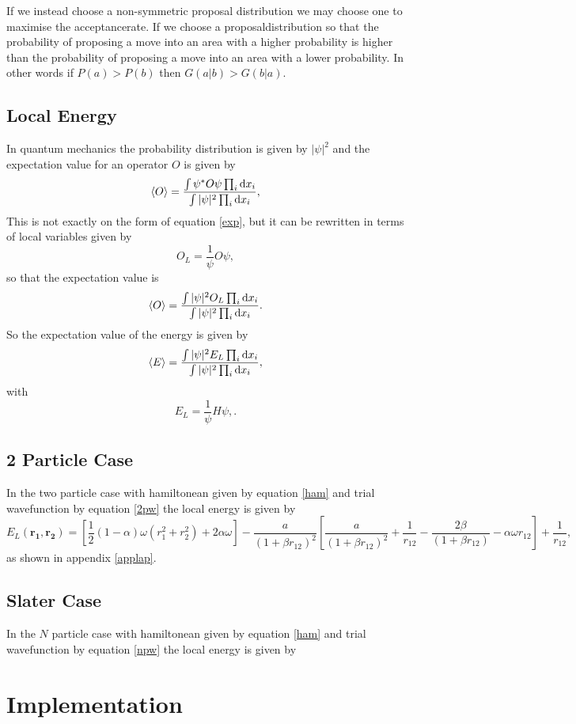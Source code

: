 \documentclass[a4paper,norsk,10pt]{article}
\newcommand{\bb}[1]{\boldsymbol{#1}}
\newcommand{\dd}{\mathrm{d}}
\newcommand{\be}{\begin{equation}}
\newcommand{\ee}{\end{equation}}
\newcommand{\f}{\frac}
\begin{document}
If we instead choose a non-symmetric proposal distribution we may choose one to maximise the acceptancerate.
If we choose a proposaldistribution so that the probability of proposing a move into an area with a higher probability is higher than
the probability of proposing a move into an area with a lower probability. In other words
if $P(a)>P(b)$ then $G(a|b)>G(b|a)$.

\subsection{Local Energy}
In quantum mechanics the probability distribution is given by $|\psi|^2$ and the expectation value for an operator $O$ is given by
\be
\braket{O} = \f{\int\psi^*O\psi\prod_i\dd x_i}{\int|\psi|^2\prod_i\dd x_i},
\ee
This is not exactly on the form of equation \ref{exp}, but it can be rewritten in terms of local variables given by
\be
O_L = \f{1}{\psi}O\psi, \label{localdef}
\ee
so that the expectation value is
\be
\braket{O} =  \f{\int|\psi|^2O_L\prod_i\dd x_i}{\int|\psi|^2\prod_i\dd x_i}.
\ee
So the expectation value of the energy is given by
\be
\braket{E} =  \f{\int|\psi|^2E_L\prod_i\dd x_i}{\int|\psi|^2\prod_i\dd x_i},
\ee
with
\be
E_L = \f{1}{\psi}H\psi, \label{localEdef}.
\ee

\subsection{2 Particle Case}

In the two particle case with hamiltonean given by equation \ref{ham} and trial wavefunction by equation \ref{2pw} the local energy is given by
\be
E_L(\bb{r_1},\bb{r_2}) = \left[\f{1}{2}(1- \alpha)\omega(r_1^2 + r_2^2) + 2\alpha\omega\right]  - \f{a}{(1+\beta r_{12})^2}\left[\f{a}{(1+\beta r_{12})^2}+  \f{1}{r_{12}} - \f{2\beta}{(1+\beta r_{12})} -\alpha\omega r_{12}\right] + \f{1}{r_{12}},
\ee
as shown in appendix \ref{applap}.

\subsection{Slater Case}
In the $N$ particle case with hamiltonean given by equation \ref{ham} and trial wavefunction by equation \ref{npw} the local energy is given by






\section{Implementation}
\end{document}
